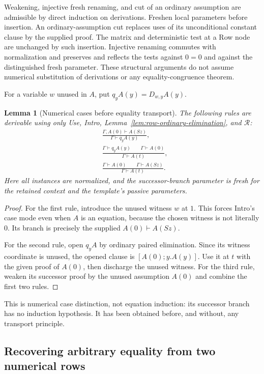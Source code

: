 \documentclass[11pt,letterpaper]{article}
\newtheorem{lemma}[theorem]{Lemma}
\theoremstyle{definition}\newtheorem{definition}[theorem]{Definition}
\theoremstyle{remark}\newtheorem{remark}[theorem]{Remark}
\begin{document}
Weakening, injective fresh renaming, and cut of an ordinary assumption
are admissible by direct induction on derivations.  Freshen local
parameters before insertion.  An ordinary-assumption cut replaces uses
of its unconditional constant clause by the supplied proof.  The matrix
and deterministic test at a Row node are unchanged by such insertion.
Injective renaming commutes with normalization and preserves and reflects
the tests against $0=0$ and against the distinguished fresh parameter.
These structural arguments do not assume numerical substitution of
derivations or any equality-congruence theorem.

For a variable $w$ unused in $A$, put
$q_yA(y)=D_{w,y}A(y)$.

\begin{lemma}[Numerical cases before equality transport]
\label{lem:row-cases}
The following rules are derivable using only Use, Intro,
Lemma~\ref{lem:row-ordinary-elimination}, and $\mathcal R$:
\begin{align*}
 &\frac{\Gamma,A(0)\vdash A(Sz)}
        {\Gamma\vdash q_yA(y)},\\[4pt]
 &\frac{\Gamma\vdash q_yA(y)\qquad\Gamma\vdash A(0)}
        {\Gamma\vdash A(t)},\\[4pt]
 &\frac{\Gamma\vdash A(0)\qquad\Gamma\vdash A(Sz)}
        {\Gamma\vdash A(t)}.
\end{align*}
Here all instances are normalized, and the successor-branch parameter is
fresh for the retained context and the template's passive parameters.
\end{lemma}
\begin{proof}
For the first rule, introduce the unused witness $w$ at $1$.  This forces
Intro's case mode even when $A$ is an equation, because the chosen
witness is not literally $0$.  Its branch is precisely the supplied
$A(0)\vdash A(Sz)$.

For the second rule, open $q_yA$ by ordinary paired elimination.  Since
its witness coordinate is unused, the opened clause is
$[A(0);y.A(y)]$.  Use it at $t$ with the given proof of $A(0)$, then
discharge the unused witness.  For the third rule, weaken its successor
proof by the unused assumption $A(0)$ and combine the first two rules.
\end{proof}

This is numerical case distinction, not equation induction: its
successor branch has no induction hypothesis.  It has been obtained
before, and without, any transport principle.

\subsection{Recovering arbitrary equality from two numerical rows}
\end{document}
